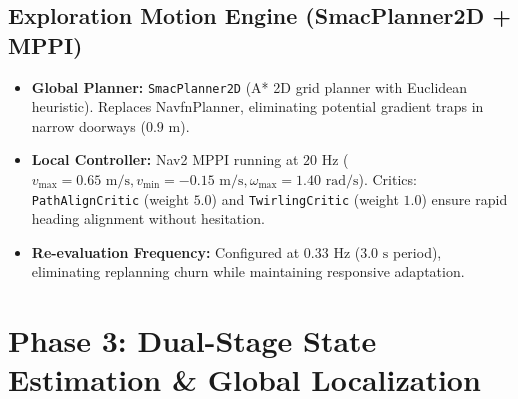 \documentclass[10pt,a4paper]{article}
\begin{document}
\subsection{Exploration Motion Engine (SmacPlanner2D + MPPI)}
\begin{itemize}
    \item \textbf{Global Planner:} \texttt{SmacPlanner2D} (A* 2D grid planner with Euclidean heuristic). Replaces NavfnPlanner, eliminating potential gradient traps in narrow doorways ($0.9\text{ m}$).
    \item \textbf{Local Controller:} Nav2 MPPI running at $20\text{ Hz}$ ($v_{\text{max}} = 0.65\text{ m/s}, v_{\text{min}} = -0.15\text{ m/s}, \omega_{\text{max}} = 1.40\text{ rad/s}$). Critics: \texttt{PathAlignCritic} (weight $5.0$) and \texttt{TwirlingCritic} (weight $1.0$) ensure rapid heading alignment without hesitation.
    \item \textbf{Re-evaluation Frequency:} Configured at $0.33\text{ Hz}$ ($3.0\text{ s}$ period), eliminating replanning churn while maintaining responsive adaptation.
\end{itemize}

\section{Phase 3: Dual-Stage State Estimation \& Global Localization}
\end{document}
